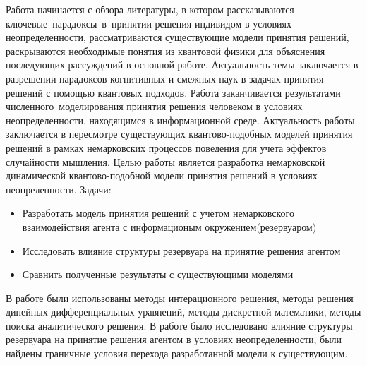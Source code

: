 \Introduction

Работа начинается с обзора литературы, в котором рассказываются ключевые~парадоксы~в~принятии
решения индивидом в условиях неопределенности, рассматриваются существующие модели принятия решений,
раскрываются необходимые понятия из квантовой физики для объяснения последующих рассуждений в
основной работе.
Актуальность темы заключается в разрешении парадоксов когнитивных и смежных наук в задачах принятия
решений с помощью квантовых подходов.
Работа заканчивается результатами численного~моделирования принятия решения человеком в условиях
неопределенности, находящимся в информационной среде.
Актуальность работы заключается в пересмотре существующих квантово-подобных моделей принятия решений
в рамках немарковских процессов поведения для учета эффектов случайности мышления.
Целью работы является разработка немарковской динамической квантово-подобной модели принятия решений
в условиях неопреленности.
Задачи:
\begin{itemize}
    \item Разработать модель принятия решений с учетом немарковского взаимодействия агента с информационым окружением(резервуаром)
    \item Исследовать влияние структуры резервуара на принятие решения агентом
    \item Сравнить полученные результаты с существующими моделями
\end{itemize}
В работе были использованы методы интерационного решения, методы решения динейных дифференциальных уравнений,
методы дискретной математики, методы поиска аналитического решения.
В работе было исследовано влияние структуры резервуара на принятие решения агентом в условиях неопределенности,
были найдены граничные условия перехода разработанной модели к существующим.
